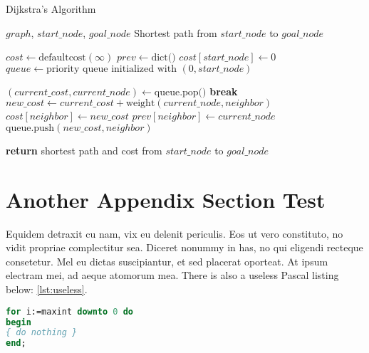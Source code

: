 \begin{algorithm}[H]
  \caption{Dijkstra's Algorithm}
  \label{alg:dijkstra}
  \begin{algorithmic}[1]
  \REQUIRE $graph$, $start\_node$, $goal\_node$
  \ENSURE Shortest path from $start\_node$ to $goal\_node$
  
  \STATE $cost \gets \text{defaultcost}(\infty)$ 
  \STATE $prev \gets \text{dict()}$ 
  \STATE $cost[start\_node] \gets 0$
  \STATE $queue \gets \text{priority queue initialized with } (0, start\_node)$
  
      \STATE $(current\_cost, current\_node) \gets \text{queue.pop()}$
          \STATE \textbf{break}
      \ENDIF
          \STATE $new\_cost \gets current\_cost + \text{weight}(current\_node, neighbor)$
              \STATE $cost[neighbor] \gets new\_cost$
              \STATE $prev[neighbor] \gets current\_node$
              \STATE $\text{queue.push}(new\_cost, neighbor)$
          \ENDIF
      \ENDFOR
  \ENDWHILE
  
  \STATE \textbf{return} shortest path and cost from $start\_node$ to $goal\_node$
  \end{algorithmic}
  \end{algorithm}
  




\section{Another Appendix Section Test}
Equidem detraxit cu nam, vix eu delenit periculis. Eos ut vero
constituto, no vidit propriae complectitur sea. Diceret nonummy in
has, no qui eligendi recteque consetetur. Mel eu dictas suscipiantur,
et sed placerat oporteat. At ipsum electram mei, ad aeque atomorum
mea. There is also a useless Pascal listing below: \autoref{lst:useless}.

\begin{lstlisting}[float=b,language=Pascal,frame=tb,caption={A floating example (\texttt{listings} manual)},label=lst:useless]
for i:=maxint downto 0 do
begin
{ do nothing }
end;
\end{lstlisting}



